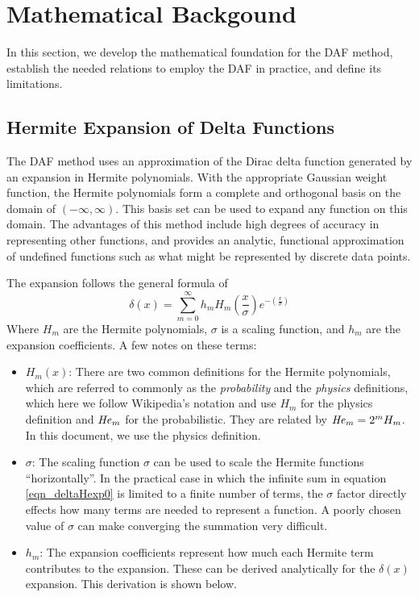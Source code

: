 \documentclass[preprint]{revtex4}
\begin{document}
\section{Mathematical Backgound}
In this section, we develop the mathematical foundation for the DAF method, establish 
the needed relations to employ the DAF in practice, and define its limitations. 

\subsection{Hermite Expansion of Delta Functions}
The DAF method uses an approximation of the Dirac delta function generated by 
an expansion in Hermite polynomials. With the appropriate Gaussian weight function, 
the Hermite polynomials form a complete and orthogonal basis on the domain of 
$(-\infty,\infty)$. 
This basis set can be used to expand any function on this domain. The advantages
of this method include high degrees of accuracy in representing other functions, 
and provides an analytic, functional approximation of undefined functions such as 
what might be represented by discrete data points. 

The expansion follows the general formula\cite{HermiteWiki} of 
\begin{equation}
\label{eqn_deltaHexp0}
\delta(x) = \sum_{m=0}^\infty h_m H_m\left(\frac{x}{\sigma}\right) e^{-\left(\frac{x}{\sigma}\right)}
\end{equation}
Where $H_m$ are the Hermite polynomials, $\sigma$ is a scaling function, and $h_m$ are the
expansion coefficients. A few notes on these terms: 
\begin{itemize}
\item{$H_m(x)$}: There are two common definitions for the Hermite polynomials, which are referred
to commonly as the {\it probability} and the {\it physics} definitions, which here we follow
Wikipedia's notation and use $H_m$ for the physics definition and ${\it He}_m$ for the probabilistic. 
They are related by ${\it He}_m = 2^m H_m$. In this document, we use the physics definition. 
\item{$\sigma$}: The scaling function $\sigma$ can be used to scale the Hermite functions 
``horizontally''. In the practical case in which the infinite sum in equation \ref{eqn_deltaHexp0}
is limited to a finite number of terms, the $\sigma$ factor directly effects how many terms
are needed to represent a function. 
A poorly chosen value of $\sigma$ can make converging the summation very difficult. 

\item{$h_m$}: The expansion coefficients represent how much each Hermite term contributes to the
expansion. These can be derived analytically for the $\delta(x)$ expansion.
This derivation is shown below. 
\end{itemize}
\end{document}
